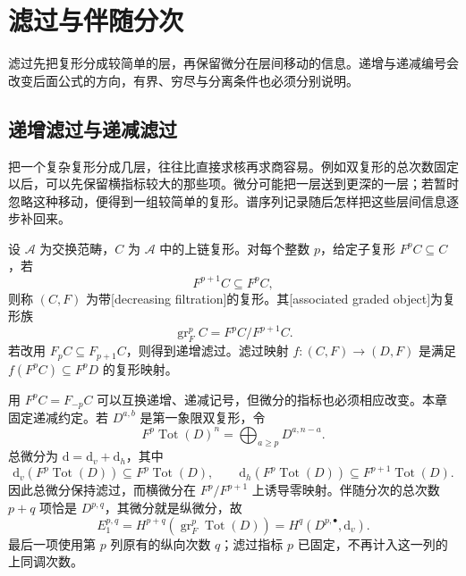 
\section{滤过与伴随分次}
\label{b4:sec:1401}

滤过先把复形分成较简单的层，再保留微分在层间移动的信息。递增与递减编号会改变后面公式的方向，有界、穷尽与分离条件也必须分别说明。

%
%

\subsection{递增滤过与递减滤过}
\label{b4:subsec:1401:01}

把一个复杂复形分成几层，往往比直接求核再求商容易。例如双复形的总次数固定以后，可以先保留横指标较大的那些项。微分可能把一层送到更深的一层；若暂时忽略这种移动，便得到一组较简单的复形。谱序列记录随后怎样把这些层间信息逐步补回来。

\begin{definition}\label{b4:def:filtered-complex}
	设 \(\mathcal A\) 为交换范畴，\(C\) 为 \(\mathcal A\) 中的上链复形。对每个整数 \(p\)，给定子复形 \(F^pC\subseteq C\)，若
	\[
		F^{p+1}C\subseteq F^pC,
	\]
	则称 \((C,F)\) 为带[decreasing filtration]的复形。其[associated graded object]为复形族
	\[
		\operatorname{gr}_F^pC=F^pC/F^{p+1}C.
	\]
	若改用 \(F_pC\subseteq F_{p+1}C\)，则得到递增滤过。滤过映射 \(f:(C,F)\to(D,F)\) 是满足 \(f(F^pC)\subseteq F^pD\) 的复形映射。
\end{definition}

用 \(F^pC=F_{-p}C\) 可以互换递增、递减记号，但微分的指标也必须相应改变。本章固定递减约定。若 \(D^{a,b}\) 是第一象限双复形，令
\[
	F^p\operatorname{Tot}(D)^n=\bigoplus_{a\ge p}D^{a,n-a}.
\]
总微分为 \(\mathrm d=\mathrm d_v+\mathrm d_h\)，其中
\[
	\mathrm d_v(F^p\operatorname{Tot}(D))\subseteq F^p\operatorname{Tot}(D), \qquad \mathrm d_h(F^p\operatorname{Tot}(D))\subseteq F^{p+1}\operatorname{Tot}(D).
\]
因此总微分保持滤过，而横微分在 \(F^p/F^{p+1}\) 上诱导零映射。伴随分次的总次数 \(p+q\) 项恰是 \(D^{p,q}\)，其微分就是纵微分，故
\[
	E_1^{p,q}=H^{p+q}(\operatorname{gr}_F^p\operatorname{Tot}(D)) =H^q(D^{p,\bullet},\mathrm d_v).
\]
最后一项使用第 \(p\) 列原有的纵向次数 \(q\)；滤过指标 \(p\) 已固定，不再计入这一列的上同调次数。

